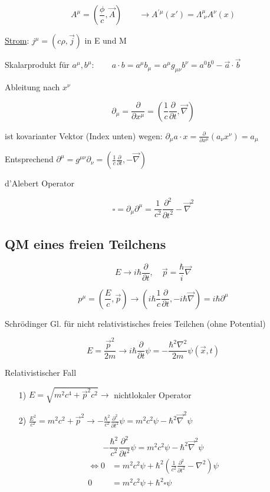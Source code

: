\[A^\mu = (\frac{\phi}{c},\vec A) \qquad \rightarrow  A^{'\mu}(x') = \Lambda^\mu_{\,\,\nu} A^\nu(x)\]

\underline{Strom}: \(j^\mu = (c\rho,\vec j)\) in E und M

Skalarprodukt für \(a^\mu,b^\mu: \qquad a\cdot b = a^\mu b_\mu = a^\mu g_{\mu\nu}b^\nu = a^0 b^0 - \vec a\cdot \vec b\)

Ableitung nach \(x^\nu\)

\[\partial_\mu = \frac{\partial}{\partial x^\mu} = (\frac{1}{c} \frac{\partial}{\partial t},\vec \nabla )\]

ist kovarianter Vektor (Index unten) wegen: \(\partial_{\mu} a\cdot x = \frac{\partial}{\partial x^\mu}(a_\nu x^\nu)= a_\mu\)

Entsprechend \(\partial^\mu = g^{\mu\nu}\partial_\nu = (\frac{1}{c}\frac{\partial}{\partial t},-\vec\nabla)\)


d'Alebert Operator

\[\square = \partial_\mu\partial^\mu = \frac{1}{c^2} \frac{\partial^2}{\partial t^2} - \vec \nabla^2\]



\subsection{QM eines freien Teilchens}

\[E\rightarrow i\hbar\frac{\partial}{\partial t}, \quad \vec p = \frac{\hbar}{i}\vec \nabla\]

\[ p^\mu = (\frac{E}{c},\vec p) \rightarrow (i\hbar \frac{1}{c}\frac{\partial}{\partial t},-i\hbar \vec \nabla) = i\hbar\partial^\mu\]

Schrödinger Gl. für nicht relativistisches freies Teilchen (ohne Potential)

\[E=\frac{\vec p^2}{2m} \rightarrow  i\hbar \frac{\partial }{\partial t}\psi = -\frac{\hbar^2\nabla^2}{2m}\psi(\vec x,t) \]


Relativistischer Fall


\begin{enumerate}
\item[1)] \(E = \sqrt{m^2c^4+\vec p^2c^2} \rightarrow \) nichtlokaler Operator
\item[2)] \(\frac{E^2}{c^2} = m^2c^2 + \vec p^2 \rightarrow - \frac{\hbar^2}{c^2}\frac{\partial^2 }{\partial t^2}\psi = m^2c^2\psi -\hbar^2\vec \nabla^2\psi \)
\end{enumerate}

\[ - \frac{\hbar^2}{c^2}\frac{\partial^2 }{\partial t^2}\psi = m^2c^2\psi -\hbar^2\vec \nabla^2\psi\]
\begin{align}
\Leftrightarrow  0 &= m^2c^2\psi + \hbar^2\left(\frac{1}{c^2}\frac{\partial^2}{\partial t^2}  - \nabla^2\right)\psi\\
0&= m^2c^2\psi+\hbar^2 \square \psi
\end{align}


